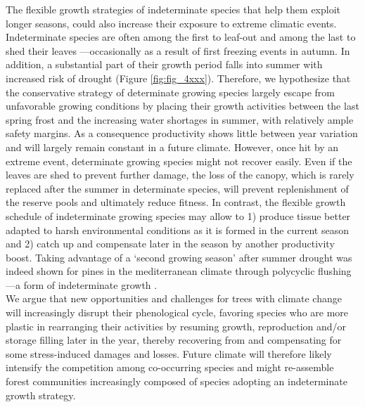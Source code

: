 \documentclass{article}
\begin{document}
The flexible growth strategies of indeterminate species that help them exploit longer seasons, could also increase their exposure to extreme climatic events. Indeterminate species are often among the first to leaf-out and among the last to shed their leaves \citep{marksRelationExtensionGrowth1975, boojhGrowthStrategyTrees1982}---occasionally as a result of first freezing events in autumn. In addition, a substantial part of their growth period falls into summer with increased risk of drought (Figure \ref{fig:fig_4xxx}). Therefore, we hypothesize that the conservative strategy of determinate growing species largely escape from unfavorable growing conditions by placing their growth activities between the last spring frost and the increasing water shortages in summer, with relatively ample safety margins. As a consequence productivity shows little between year variation and will largely remain constant in a future climate. However, once hit by an extreme event, determinate growing species might not recover easily. Even if the leaves are shed to prevent further damage, the loss of the canopy, which is rarely replaced after the summer in determinate species, will prevent replenishment of the reserve pools and ultimately reduce fitness. In contrast, the flexible growth schedule of indeterminate growing species may allow to 1) produce tissue better adapted to harsh environmental conditions as it is formed in the current season and 2) catch up and compensate later in the season by another productivity boost. Taking advantage of a `second growing season' after summer drought was indeed shown for pines in the mediterranean climate through polycyclic flushing---a form of indeterminate growth \citep[Figure \ref{fig:fig_2xxx}]{girardPolycyclismFundamentalTree2011}. \\

We argue that new opportunities and challenges for trees with climate change will increasingly disrupt their phenological cycle, favoring species who are more plastic in rearranging their activities by resuming growth, reproduction and/or storage filling later in the year, thereby recovering from and compensating for some stress-induced damages and losses. Future climate will therefore likely intensify the competition among co-occurring species and might re-assemble forest communities increasingly composed of species adopting an indeterminate growth strategy.
	
\end{document}
